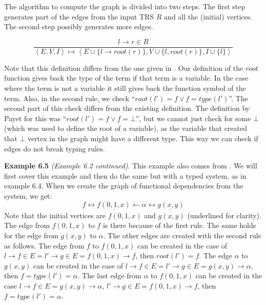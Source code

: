 The algorithm to compute the graph is divided into two steps. The first step generates part of the edges from the input TRS $R$ and all the (initial) vertices. The second step possibly generates more edges. 
\begin{definition}
\label{def:gofd}
\[
\frac{l \rightarrow r \in R}{\left< E, V, I \right> \mapsto \left< E \cup \{ l \rightarrow \textit{root}(r) \}, V \cup \{ l, \textit{root}(r) \}, I \cup \{ l \} \right>}
\]
\begin{center}
\end{center}
\end{definition}
Note that this definition differs from the one given in \cite{Payet:Unfolding}. Our definition of the $\textit{root}$ function gives back the type of the term if that term is a variable. In the case where the term is not a variable it still gives back the function symbol of the term. Also, in the second rule, we check ``$\textit{root}(l') = f \lor f = \textit{type}(l')$''. The second part of this check differs from the existing definition. The definition by Payet for this was ``$\textit{root}(l') = f \lor f = \bot$'', but we cannot just check for some $\bot$ (which was used to define the root of a variable), as the variable that created that $\bot$ vertex in the graph might have a different type. This way we can check if edges do not break typing rules. 

\textbf{Example 6.5} \textit{(Example 6.2 continued)}. This example also comes from \cite{Payet:Unfolding}. We will first cover this example and then do the same but with a typed system, as in example 6.4. When we create the graph of functional dependencies from the system, we get:
\[
f \longleftrightarrow \underline{f(0, 1, x)} \longleftarrow \alpha \longleftrightarrow \underline{g(x,y)}
\]
Note that the initial vertices are $f(0, 1, x)$ and $g(x, y)$ (underlined for clarity). The edge from $f(0, 1, x)$ to $f$ is there because of the first rule. The same holds for the edge from $g(x, y)$ to $\alpha$. The other edges are created with the second rule as follows. The edge from $f$ to $f(0, 1, x)$ can be created in the case of $l \rightarrow f \in E = l' \rightarrow g \in E = f(0, 1, x) \rightarrow f$, then $\textit{root}(l') = f$. The edge $\alpha$ to $g(x, y)$ can be created in the case of $l \rightarrow f \in E = l' \rightarrow g \in E = g(x, y) \rightarrow \alpha$, then $f = \textit{type}(l') = \alpha$. The last edge from $\alpha$ to $f(0, 1, x)$ can be created in the case $l \rightarrow f \in E = g(x, y) \rightarrow \alpha$, $l' \rightarrow g \in E = f(0, 1, x) \rightarrow f$, then $f = \textit{type}(l') = \alpha$. 


